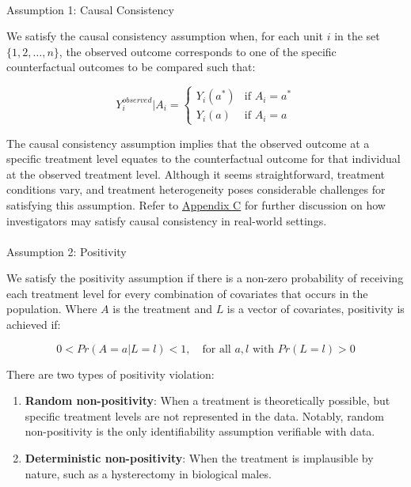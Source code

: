 \documentclass[
  single column]{article}
\makeatletter
\let\oldparagraph\paragraph
\renewcommand{\paragraph}{
    \@ifstar
      \xxxParagraphStar
      \xxxParagraphNoStar
  }
\newcommand{\xxxParagraphStar}[1]{\oldparagraph*{#1}\mbox{}}
\newcommand{\xxxParagraphNoStar}[1]{\oldparagraph{#1}\mbox{}}
\providecommand{\tightlist}{%
  \setlength{\itemsep}{0pt}\setlength{\parskip}{0pt}}\usepackage{longtable,booktabs,array}
\makeatother
\begin{document}
\paragraph{Assumption 1: Causal
Consistency}\label{assumption-1-causal-consistency}

We satisfy the causal consistency assumption when, for each unit \(i\)
in the set \(\{1, 2, \ldots, n\}\), the observed outcome corresponds to
one of the specific counterfactual outcomes to be compared such that:

\[
Y_i^{observed}|A_i = 
\begin{cases} 
Y_i(a^*) & \text{if } A_i = a^* \\
Y_i(a) & \text{if } A_i = a
\end{cases}
\]

The causal consistency assumption implies that the observed outcome at a
specific treatment level equates to the counterfactual outcome for that
individual at the observed treatment level. Although it seems
straightforward, treatment conditions vary, and treatment heterogeneity
poses considerable challenges for satisfying this assumption. Refer to
\hyperref[id-app-c]{Appendix C} for further discussion on how
investigators may satisfy causal consistency in real-world settings.

\paragraph{Assumption 2: Positivity}\label{assumption-2-positivity}

We satisfy the positivity assumption if there is a non-zero probability
of receiving each treatment level for every combination of covariates
that occurs in the population. Where \(A\) is the treatment and \(L\) is
a vector of covariates, positivity is achieved if:

\[
0 < Pr(A = a | L = l) < 1, \quad \text{for all } a, l \text{ with } Pr(L = l) > 0
\]

There are two types of positivity violation:

\begin{enumerate}
\def\labelenumi{\arabic{enumi}.}
\tightlist
\item
  \textbf{Random non-positivity}: When a treatment is theoretically
  possible, but specific treatment levels are not represented in the
  data. Notably, random non-positivity is the only identifiability
  assumption verifiable with data.
\item
  \textbf{Deterministic non-positivity}: When the treatment is
  implausible by nature, such as a hysterectomy in biological males.
\end{enumerate}
\end{document}
